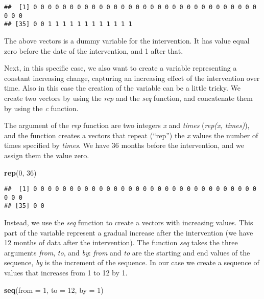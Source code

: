 \documentclass[
]{article}
\newenvironment{Shaded}{\begin{snugshade}}{\end{snugshade}}
\newcommand{\AttributeTok}[1]{\textcolor[rgb]{0.13,0.29,0.53}{#1}}
\newcommand{\DecValTok}[1]{\textcolor[rgb]{0.00,0.00,0.81}{#1}}
\newcommand{\FunctionTok}[1]{\textcolor[rgb]{0.13,0.29,0.53}{\textbf{#1}}}
\newcommand{\NormalTok}[1]{#1}
\begin{document}
\begin{verbatim}
##  [1] 0 0 0 0 0 0 0 0 0 0 0 0 0 0 0 0 0 0 0 0 0 0 0 0 0 0 0 0 0 0 0 0 0 0
## [35] 0 0 1 1 1 1 1 1 1 1 1 1 1 1
\end{verbatim}

The above vectors is a dummy variable for the intervention. It has value equal zero before the date of the intervention, and 1 after that.

Next, in this specific case, we also want to create a variable representing a constant increasing change, capturing an increasing effect of the intervention over time.
Also in this case the creation of the variable can be a little tricky. We create two vectors by using the \emph{rep} and the \emph{seq} function, and concatenate them by using the \emph{c} function.

The argument of the \emph{rep} function are two integers \emph{x} and \emph{times} (\emph{rep(x, times)}), and the function creates a vectors that repeat (``rep'') the \emph{x} values the number of times specified by \emph{times}. We have 36 months before the intervention, and we assign them the value zero.

\begin{Shaded}
\begin{Highlighting}[]
\FunctionTok{rep}\NormalTok{(}\DecValTok{0}\NormalTok{, }\DecValTok{36}\NormalTok{)}
\end{Highlighting}
\end{Shaded}

\begin{verbatim}
##  [1] 0 0 0 0 0 0 0 0 0 0 0 0 0 0 0 0 0 0 0 0 0 0 0 0 0 0 0 0 0 0 0 0 0 0
## [35] 0 0
\end{verbatim}

Instead, we use the \emph{seq} function to create a vectors with increasing values. This part of the variable represent a gradual increase after the intervention (we have 12 months of data after the intervention). The function \emph{seq} takes the three arguments \emph{from}, \emph{to}, and \emph{by}: \emph{from} and \emph{to} are the starting and end values of the sequence, \emph{by} is the increment of the sequence. In our case we create a sequence of values that increases from 1 to 12 by 1.

\begin{Shaded}
\begin{Highlighting}[]
\FunctionTok{seq}\NormalTok{(}\AttributeTok{from =} \DecValTok{1}\NormalTok{, }\AttributeTok{to =} \DecValTok{12}\NormalTok{, }\AttributeTok{by =} \DecValTok{1}\NormalTok{)}
\end{Highlighting}
\end{Shaded}
\end{document}
